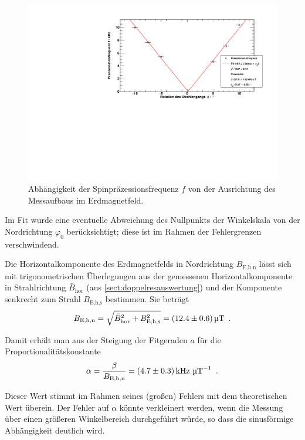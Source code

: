 \begin{figure}[H]
\begin{center}
  \includegraphics[width=\textwidth]{../img/part4/winkel.pdf}
  \caption{Abhängigkeit der Spinpräzessionsfrequenz $f$ von der Ausrichtung des Messaufbaus im Erdmagnetfeld.}
  \label{img:spp:Winkelabhängigkeit}
\end{center}
\end{figure} 

Im Fit wurde eine eventuelle Abweichung des Nullpunkts der Winkelskala
von der Nordrichtung $\varphi_0$ berücksichtigt;
diese ist im Rahmen der Fehlergrenzen verschwindend.


Die Horizontalkomponente des Erdmagnetfelds in Nordrichtung $B_\text{E,h,n}$ lässt sich
mit trigonometrischen Überlegungen aus der gemessenen Horizontalkomponente in Strahlrichtung $\bar{B}_\text{hor}$
(aus \autoref{sect:doppelresauswertung}) und der Komponente senkrecht zum Strahl $B_\text{E,h,s}$ bestimmen.
Sie beträgt
\begin{equation}
  B_\text{E,h,n} = \sqrt{\bar{B}_\text{hor}^2+B_\text{E,h,s}^2}=(12.4 \pm 0.6)\,\text{\textmu T} \ \, .
\end{equation}

Damit erhält man aus der Steigung der Fitgeraden $a$ für die Proportionalitätskonstante
\begin{equation}
  \alpha = \frac{\beta}{B_\text{E,h,n}} = (4.7\pm0.3)\,\text{kHz } \text{\textmu T}^{-1} \ \, .
\end{equation}

Dieser Wert stimmt im Rahmen seines (großen) Fehlers mit dem theoretischen Wert überein.
Der Fehler auf $\alpha$ könnte verkleinert werden,
wenn die Messung über einen größeren Winkelbereich durchgeführt würde,
so dass die sinusförmige Abhängigkeit deutlich wird.
